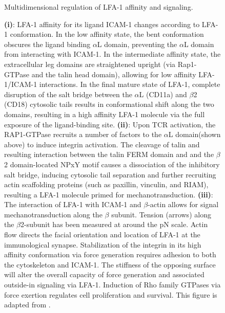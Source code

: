 \clearpage
\begin{figure}[htbp]
	\caption{Multidimensional regulation of LFA-1 affinity and signaling.}
    \caption*{\textbf{(i)}: LFA-1 affinity for its ligand ICAM-1 changes according to LFA-1 conformation. In the low affinity state, the bent conformation obscures the ligand binding $\alpha$L domain, preventing the $\alpha$L domain from interacting with ICAM-1. In the intermediate affinity state, the extracellular leg domains are straightened upright (via Rap1-GTPase and the talin head domain), allowing for low affinity LFA-1/ICAM-1 interactions. In the final mature state of LFA-1, complete disruption of the salt bridge between the $\alpha$L (CD11a) and $\beta$2 (CD18) cytosolic tails results in conformational shift along the two domains, resulting in a high affinity LFA-1 molecule via the full exposure of the ligand-binding site. \textbf{(ii)}: Upon TCR activation, the RAP1-GTPase recruits a number of factors to the $\alpha$L domain(shown above) to induce integrin activation. The cleavage of talin and resulting interaction between the talin FERM domain and and the $\beta$2 domain-located NPxY motif causes a dissociation of the inhibitory salt bridge, inducing cytosolic tail separation and  further recruiting actin scaffolding proteins (such as paxillin, vinculin, and RIAM), resulting a LFA-1 molecule primed for mechanotransduction. \textbf{(iii)}: The interaction of LFA-1 with ICAM-1 and $\beta$-actin allows for signal mechanotransduction along the $\beta$ subunit. Tension (arrows) along the $\beta$2-subunit has been measured at around the pN scale. Actin flow directs the facial orientation and location of LFA-1 at the immunological synapse. Stabilization of the integrin in its high affinity conformation via force generation requires adhesion to both the cytoskeleton and ICAM-1. The stiffness of the opposing surface will alter the overall capacity of force generation and associated outside-in signaling via LFA-1. Induction of Rho family GTPases via force exertion regulates cell proliferation and survival. This figure is adapted from \cite{Walling2018}.}
    \label{fig:lfa}
\end{figure}
\clearpage
